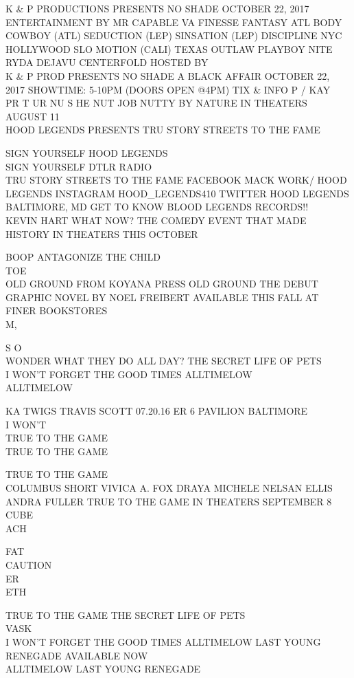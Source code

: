 \documentclass[10pt,letterpaper]{article}
\begin{document}
K \& P PRODUCTIONS PRESENTS NO SHADE OCTOBER 22, 2017 ENTERTAINMENT BY MR CAPABLE VA FINESSE FANTASY ATL BODY COWBOY (ATL) SEDUCTION (LEP) SINSATION (LEP) DISCIPLINE NYC HOLLYWOOD SLO MOTION (CALI) TEXAS OUTLAW PLAYBOY NITE RYDA DEJAVU CENTERFOLD HOSTED BY\\
K \& P PROD PRESENTS NO SHADE A BLACK AFFAIR OCTOBER 22, 2017 SHOWTIME: 5{-}10PM (DOORS OPEN @4PM) TIX \& INFO P / KAY\\
PR T UR NU S HE NUT JOB NUTTY BY NATURE IN THEATERS AUGUST 11\\
HOOD LEGENDS PRESENTS TRU STORY STREETS TO THE FAME

SIGN YOURSELF HOOD LEGENDS\\
SIGN YOURSELF DTLR RADIO\\
TRU STORY STREETS TO THE FAME FACEBOOK MACK WORK/ HOOD LEGENDS INSTAGRAM HOOD\_LEGENDS410 TWITTER HOOD LEGENDS BALTIMORE, MD GET TO KNOW BLOOD LEGENDS RECORDS!!\\
KEVIN HART WHAT NOW?  THE COMEDY EVENT THAT MADE HISTORY IN THEATERS THIS OCTOBER

BOOP ANTAGONIZE THE CHILD\\
TOE\\
OLD GROUND FROM KOYANA PRESS OLD GROUND THE DEBUT GRAPHIC NOVEL BY NOEL FREIBERT AVAILABLE THIS FALL AT FINER BOOKSTORES\\
M,

S O\\
WONDER WHAT THEY DO ALL DAY?  THE SECRET LIFE OF PETS\\
I WON'T FORGET THE GOOD TIMES ALLTIMELOW\\
ALLTIMELOW

KA TWIGS TRAVIS SCOTT 07.20.16 ER 6 PAVILION BALTIMORE\\
I WON'T\\
TRUE TO THE GAME\\
TRUE TO THE GAME

TRUE TO THE GAME\\
COLUMBUS SHORT VIVICA A. FOX DRAYA MICHELE NELSAN ELLIS ANDRA FULLER TRUE TO THE GAME IN THEATERS SEPTEMBER 8\\
CUBE\\
ACH

FAT\\
CAUTION\\
ER\\
ETH

TRUE TO THE GAME THE SECRET LIFE OF PETS\\
VASK\\
I WON'T FORGET THE GOOD TIMES ALLTIMELOW LAST YOUNG RENEGADE AVAILABLE NOW\\
ALLTIMELOW LAST YOUNG RENEGADE
\end{document}
